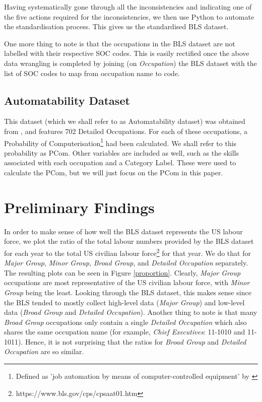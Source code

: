 \documentclass[11pt]{article}
\begin{document}
Having systematically gone through all the inconsistencies and indicating one of the five actions required for the inconsistencies, we then use Python to automate the standardisation process. This gives us the standardised BLS dataset.

One more thing to note is that the occupations in the BLS dataset are not labelled with their respective SOC codes. This is easily rectified once the above data wrangling is completed by joining (on \emph{Occupation}) the BLS dataset with the list of SOC codes to map from occupation name to code.

\subsection{Automatability Dataset}

This dataset (which we shall refer to as Automatability dataset) was obtained from \cite{futureofemployment}, and features 702 Detailed Occupations. For each of these occupations, a Probability of Computerisation\footnote{Defined as 'job automation by means of computer-controlled equipment' by \cite{osborne2017future}} had been calculated. We shall refer to this probability as PCom. Other variables are included as well, such as the skills associated with each occupation and a Category Label. These were used to calculate the PCom, but we will just focus on the PCom in this paper.

\newpage

\section{Preliminary Findings}
\label{sec:prelim findings}

In order to make sense of how well the BLS dataset represents the US labour force, we plot the ratio of the total labour numbers provided by the BLS dataset for each year to the total US civilian labour force\footnote{https://www.bls.gov/cps/cpsaat01.htm} for that year. We do that for \emph{Major Group}, \emph{Minor Group}, \emph{Broad Group}, and \emph{Detailed Occupation} separately. The resulting plots can be seen in Figure \ref{proportion}. Clearly, \emph{Major Group} occupations are most representative of the US civilian labour force, with \emph{Minor Group} being the least. Looking through the BLS dataset, this makes sense since the BLS tended to mostly collect high-level data (\emph{Major Group}) and low-level data (\emph{Broad Group} and \emph{Detailed Occupation}). Another thing to note is that many \emph{Broad Group} occupations only contain a single \emph{Detailed Occupation} which also shares the same occupation name (for example, \emph{Chief Executives}: 11-1010 and 11-1011). Hence, it is not surprising that the ratios for \emph{Broad Group} and \emph{Detailed Occupation} are so similar.
\end{document}
